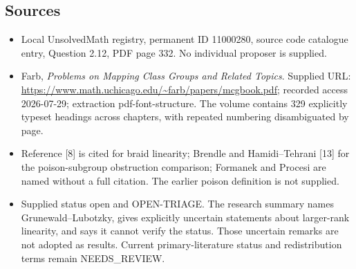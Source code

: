 \documentclass[11pt]{article}
\begin{document}
\subsection{Sources}
\begin{itemize}
\item Local UnsolvedMath registry, permanent ID 11000280, source code catalogue entry, Question 2.12, PDF page 332. No individual proposer is supplied.
\item Farb, \emph{Problems on Mapping Class Groups and Related Topics}. Supplied URL: \url{https://www.math.uchicago.edu/~farb/papers/mcgbook.pdf}; recorded access 2026-07-29; extraction pdf-font-structure. The volume contains 329 explicitly typeset headings across chapters, with repeated numbering disambiguated by page.
\item Reference [8] is cited for braid linearity; Brendle and Hamidi--Tehrani [13] for the poison-subgroup obstruction comparison; Formanek and Procesi are named without a full citation. The earlier poison definition is not supplied.
\item Supplied status open and OPEN-TRIAGE. The research summary names Grunewald--Lubotzky, gives explicitly uncertain statements about larger-rank linearity, and says it cannot verify the status. Those uncertain remarks are not adopted as results. Current primary-literature status and redistribution terms remain NEEDS\_REVIEW.
\end{itemize}
\end{document}
